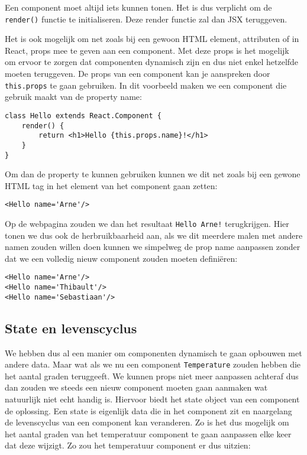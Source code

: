 Een component moet altijd iets kunnen tonen. Het is dus verplicht om de \lstinline[basicstyle=\ttfamily\color{red}]|render()| functie te initialiseren. Deze render functie zal dan JSX teruggeven.

Het is ook mogelijk om net zoals bij een gewoon HTML element, attributen of in React, props mee te geven aan een component. Met deze props is het mogelijk om ervoor te zorgen dat componenten dynamisch zijn en dus niet enkel hetzelfde moeten teruggeven. De props van een component kan je aanspreken door \lstinline[basicstyle=\ttfamily\color{red}]|this.props| te gaan gebruiken. In dit voorbeeld maken we een component die gebruik maakt van de property name:

\begin{lstlisting}[frame=single, caption=Het component Hello wordt gedefinieerd die de property 'name' gebruikt]
class Hello extends React.Component {
	render() {
		return <h1>Hello {this.props.name}!</h1>
	}
}
\end{lstlisting}

Om dan de property te kunnen gebruiken kunnen we dit net zoals bij een gewone HTML tag in het element van het component gaan zetten:

\begin{lstlisting}[frame=single, caption=Het component Hello met de property name]
<Hello name='Arne'/>
\end{lstlisting}

Op de webpagina zouden we dan het resultaat \lstinline[basicstyle=\ttfamily\color{red}]|Hello Arne!| terugkrijgen. Hier tonen we dus ook de herbruikbaarheid aan, als we dit meerdere malen met andere namen zouden willen doen kunnen we simpelweg de prop name aanpassen zonder dat we een volledig nieuw component zouden moeten definiëren:

\begin{lstlisting}[frame=single, caption=Het component Hello die meerdere malen met andere props wordt gebruikt.]
<Hello name='Arne'/>
<Hello name='Thibault'/>
<Hello name='Sebastiaan'/>
\end{lstlisting}


\subsection{State en levenscyclus}
\label{subsec:state-en-levenscyclus}
We hebben dus al een manier om componenten dynamisch te gaan opbouwen met andere data. Maar wat als we nu een component \lstinline[basicstyle=\ttfamily\color{red}]|Temperature| zouden hebben die het aantal graden teruggeeft. We kunnen props niet meer aanpassen achteraf dus dan zouden we steeds een nieuw component moeten gaan aanmaken wat natuurlijk niet echt handig is. Hiervoor biedt het state object van een component de oplossing. Een state is eigenlijk data die in het component zit en naargelang de levenscyclus van een component kan veranderen. Zo is het dus mogelijk om het aantal graden van het temperatuur component te gaan aanpassen elke keer dat deze wijzigt. Zo zou het temperatuur component er dus uitzien:

